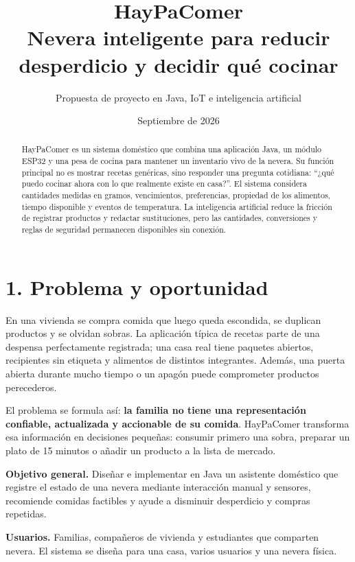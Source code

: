 \documentclass[11pt,a4paper]{article}
\title{\textbf{HayPaComer}\large\\ Nevera inteligente para reducir desperdicio y decidir qué cocinar}
\author{Propuesta de proyecto en Java, IoT e inteligencia artificial}
\date{Septiembre de 2026}
\newcommand{\titulo}[1]{\section*{#1}\addcontentsline{toc}{section}{#1}}
\begin{document}
\maketitle
\begin{abstract}
HayPaComer es un sistema doméstico que combina una aplicación Java, un módulo ESP32 y una pesa de cocina para mantener un inventario vivo de la nevera. Su función principal no es mostrar recetas genéricas, sino responder una pregunta cotidiana: ``¿qué puedo cocinar ahora con lo que realmente existe en casa?''. El sistema considera cantidades medidas en gramos, vencimientos, preferencias, propiedad de los alimentos, tiempo disponible y eventos de temperatura. La inteligencia artificial reduce la fricción de registrar productos y redactar sustituciones, pero las cantidades, conversiones y reglas de seguridad permanecen disponibles sin conexión.
\end{abstract}
\tableofcontents
\newpage

\titulo{1. Problema y oportunidad}
En una vivienda se compra comida que luego queda escondida, se duplican productos y se olvidan sobras. La aplicación típica de recetas parte de una despensa perfectamente registrada; una casa real tiene paquetes abiertos, recipientes sin etiqueta y alimentos de distintos integrantes. Además, una puerta abierta durante mucho tiempo o un apagón puede comprometer productos perecederos.

El problema se formula así: \textbf{la familia no tiene una representación confiable, actualizada y accionable de su comida}. HayPaComer transforma esa información en decisiones pequeñas: consumir primero una sobra, preparar un plato de 15 minutos o añadir un producto a la lista de mercado.

\textbf{Objetivo general.} Diseñar e implementar en Java un asistente doméstico que registre el estado de una nevera mediante interacción manual y sensores, recomiende comidas factibles y ayude a disminuir desperdicio y compras repetidas.

\textbf{Usuarios.} Familias, compañeros de vivienda y estudiantes que comparten nevera. El sistema se diseña para una casa, varios usuarios y una nevera física.
\end{document}
